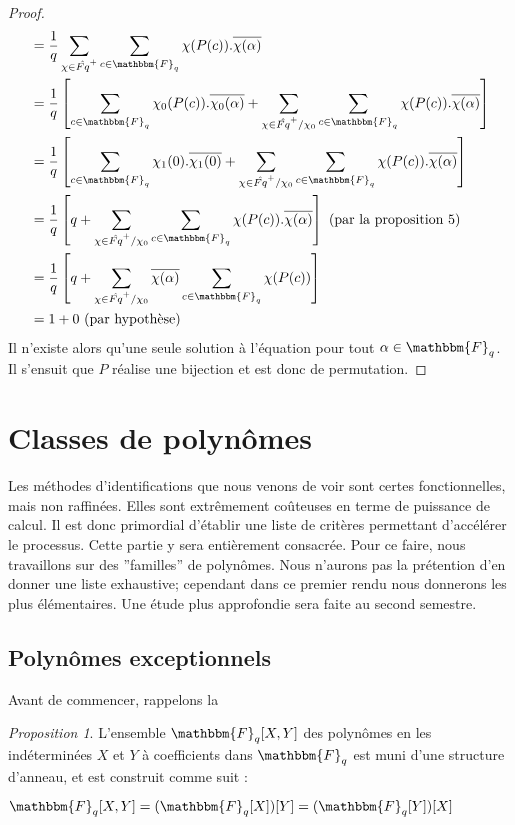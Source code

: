 \documentclass[12pt]{article}
\theoremstyle{remark}\newtheorem{note}{Note}
\theoremstyle{remark}\newtheorem{nota}{Notation}
\newcommand{\Fq}{\mathbbm{F}_q}
\newtheorem{prop}{Proposition}
\theoremstyle{definition}
\begin{document}
\begin{proof}
\begin{align*}
&= \displaystyle \frac{1}{q}\sum_{\chi \in \hat{Fq}^+}  \sum_{c\in\Fq}\chi(P(c)).\overline{\chi(\alpha)}\\
&= \displaystyle \frac{1}{q}\left[\sum_{c\in\Fq} \chi_0(P(c)).\overline{\chi_0(\alpha)}+\sum_{\chi \in \hat{Fq}^+/\chi_0} \sum_{c\in\Fq} \chi(P(c)).\overline{\chi(\alpha)}\right]\\
&= \displaystyle \frac{1}{q}\left[\sum_{c\in\Fq} \chi_1(0).\overline{\chi_1(0)}+\sum_{\chi \in \hat{Fq}^+/\chi_0} \sum_{c\in\Fq} \chi(P(c)).\overline{\chi(\alpha)}\right]\\
&= \displaystyle \frac{1}{q}\left[q+\sum_{\chi \in \hat{Fq}^+/\chi_0} \sum_{c\in\Fq} \chi(P(c)).\overline{\chi(\alpha)}\right]  \text{   (par la proposition 5)}\\
&= \displaystyle \frac{1}{q}\left[q+\sum_{\chi \in \hat{Fq}^+/\chi_0} \overline{\chi(\alpha)}\sum_{c\in\Fq} \chi(P(c))\right]\\
&= 1 + 0  \text{   (par hypothèse)}
\end{align*}
Il n'existe alors qu'une seule solution à l'équation pour tout $\alpha \in \Fq$. Il s'ensuit que $P$ réalise une bijection et est donc de permutation.

\end{proof}

\pagebreak


\section{Classes de polynômes}
Les méthodes d'identifications que nous venons de voir sont certes fonctionnelles, mais non raffinées. Elles sont extrêmement coûteuses en terme de puissance de calcul. Il est donc primordial d'établir une liste de critères permettant d'accélérer le processus. Cette partie y sera entièrement consacrée. Pour ce faire, nous travaillons sur des ''familles'' de polynômes. Nous n'aurons pas la prétention d'en donner une liste exhaustive; cependant dans ce premier rendu nous donnerons les plus élémentaires. Une étude plus approfondie sera faite au second semestre.

\subsection{Polynômes exceptionnels}
Avant de commencer, rappelons la 

\begin{prop}
L'ensemble $\Fq[X,Y]$ des polynômes en les indéterminées $X$ et $Y$ à coefficients dans $\Fq$ est muni d'une structure d'anneau, et est construit comme suit :
\begin{center} $\Fq[X,Y] = (\Fq[X])[Y] = (\Fq[Y])[X]$ \end{center}
\end{prop}
\end{document}
